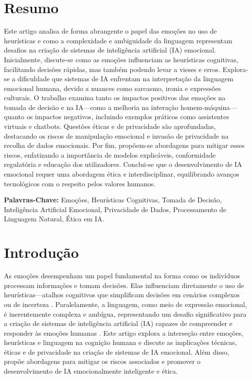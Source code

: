 \documentclass[a4paper,12pt]{report}
\begin{document}
	\section*{Resumo}
	
	Este artigo analisa de forma abrangente o papel das emoções no uso de heurísticas e como a complexidade e ambiguidade da linguagem representam desafios na criação de sistemas de inteligência artificial (IA) emocional. Inicialmente, discute-se como as emoções influenciam as heurísticas cognitivas, facilitando decisões rápidas, mas também podendo levar a vieses e erros. Explora-se a dificuldade que sistemas de IA enfrentam na interpretação da linguagem emocional humana, devido a nuances como sarcasmo, ironia e expressões culturais. O trabalho examina tanto os impactos positivos das emoções na tomada de decisão e na IA—como a melhoria na interação homem-máquina—quanto os impactos negativos, incluindo exemplos práticos como assistentes virtuais e chatbots. Questões éticas e de privacidade são aprofundadas, destacando os riscos de manipulação emocional e invasão de privacidade na recolha de dados emocionais. Por fim, propõem-se abordagens para mitigar esses riscos, enfatizando a importância de modelos explicáveis, conformidade regulatória e educação dos utilizadores. Conclui-se que o desenvolvimento de IA emocional requer uma abordagem ética e interdisciplinar, equilibrando avanços tecnológicos com o respeito pelos valores humanos.
	
	\vspace{3em}
	
	\noindent\textbf{Palavras-Chave:} \normalsize{Emoções, Heurísticas Cognitivas, Tomada de Decisão, Inteligência Artificial Emocional, Privacidade de Dados, Processamento de Linguagem Natural, Ética em IA.}
	
	\newpage
	
	
	\section{Introdução}
	
	As emoções desempenham um papel fundamental na forma como os indivíduos processam informações e tomam decisões. Elas influenciam diretamente o uso de heurísticas—atalhos cognitivos que simplificam decisões em cenários complexos ou de incerteza \parencite{kahneman1974}. Paralelamente, a linguagem, como meio de expressão emocional, é inerentemente complexa e ambígua, representando um desafio significativo para a criação de sistemas de inteligência artificial (IA) capazes de compreender e responder às emoções humanas \parencite{chomsky1965}. Este artigo explora a interseção entre emoções, heurísticas e linguagem na cognição humana e discute as implicações técnicas, éticas e de privacidade na criação de sistemas de IA emocional. Além disso, propõe abordagens para mitigar os riscos associados e promover o desenvolvimento de IA emocionalmente inteligente e ética.
	
\end{document}
